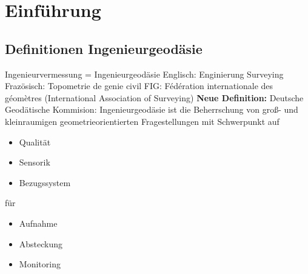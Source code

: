 \documentclass[12pt]{article}
\begin{document}
	\pagestyle{main}
\tableofcontents
\newpage
\section{Einführung}
\subsection{Definitionen Ingenieurgeodäsie}
Ingenieurvermessung = Ingenieurgeodäsie
\newline
Englisch: Enginierung Surveying
\newline
Frazösisch: Topometrie de genie civil
\newline
FIG: Fédération internationale des géomètres (International Association of Surveying)
\newline
\newline
\textbf{Neue Definition:}
 Deutsche Geodätische Kommision:
Ingenieurgeodäsie ist die Beherrschung von groß- und kleinraumigen geometrieorientierten Fragestellungen mit Schwerpunkt auf
\begin{itemize}
\item Qualität
\item Sensorik
\item Bezugssystem
\end{itemize}
für
\begin{itemize}
\item Aufnahme
\item Absteckung
\item Monitoring
\end{itemize}
\end{document}
